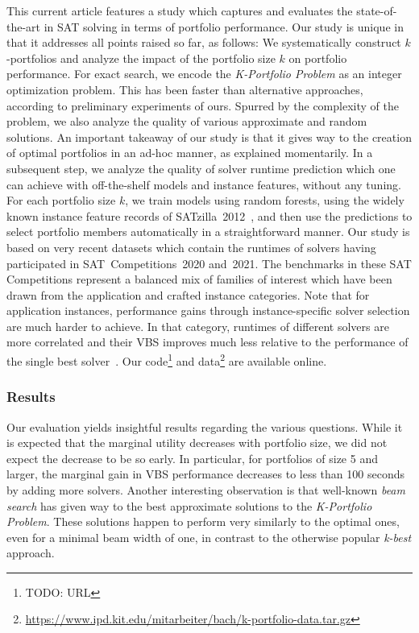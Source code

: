 \documentclass[conference]{IEEEtran}
\newcommand{\todo}[1]{{\color{red}TODO: #1}}
\begin{document}
This current article features a study which captures and evaluates the state-of-the-art in SAT solving in terms of portfolio performance. 
Our study is unique in that it addresses all points raised so far, as follows:
We systematically construct $k$-portfolios and analyze the impact of the portfolio size $k$ on portfolio performance. 
For exact search, we encode the \emph{K-Portfolio Problem} as an integer optimization problem. 
This has been faster than alternative approaches, according to preliminary experiments of ours. 
Spurred by the complexity of the problem, we also analyze the quality of various approximate and random solutions. 
An important takeaway of our study is that it gives way to the creation of optimal portfolios in an ad-hoc manner, as explained momentarily. 
In a subsequent step, we analyze the quality of solver runtime prediction which one can achieve with off-the-shelf models and instance features, without any tuning.
For each portfolio size $k$, we train models using random forests, using the widely known instance feature records of SATzilla~2012~\cite{xu2012satzilla2012}, and then use the predictions to select portfolio members automatically in a straightforward manner. 
Our study is based on very recent datasets which contain the runtimes of solvers having participated in SAT~Competitions~2020 and~2021. 
The benchmarks in these SAT Competitions represent a balanced mix of families of interest which have been drawn from the application and crafted instance categories. 
Note that for application instances, performance gains through instance-specific solver selection are much harder to achieve. 
In that category, runtimes of different solvers are more correlated and their VBS improves much less relative to the performance of the single best solver~\cite{Collautti:2013:SNNAP}. 
Our code\footnote{\todo{URL}} and data\footnote{\url{https://www.ipd.kit.edu/mitarbeiter/bach/k-portfolio-data.tar.gz}} are available online.


\subsubsection{Results}

Our evaluation yields insightful results regarding the various questions. 
While it is expected that the marginal utility decreases with portfolio size, we did not expect the decrease to be so early. 
In particular, for portfolios of size 5 and larger, the marginal gain in VBS performance decreases to less than 100 seconds by adding more solvers.  
Another interesting observation is that well-known \emph{beam search} has given way to the best approximate solutions to the \emph{K-Portfolio Problem}. 
These solutions happen to perform very similarly to the optimal ones, even for a minimal beam width of one, in contrast to the otherwise popular \emph{k-best} approach. 
\end{document}
